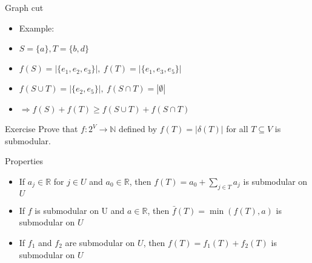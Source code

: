 \documentclass[usenames,dvipsnames]{beamer}
\newcommand{\R}{\mathbb{R}}
\newcommand{\N}{\mathbb{N}}
\begin{document}
  \begin{frame}{Graph cut}
    \begin{center}
    \end{center}
    \begin{itemize}
    \item[] Example: 
    \item $S = \{a\}, T = \{b,d\}$
    \item $f(S) = |\{e_1, e_2, e_3\}|,~f(T) = |\{e_1, e_3, e_5\}|$
    \item $f(S \cup T) = |\{e_2, e_5\}|,~f(S \cap T) = |\emptyset|$
    \item $\Rightarrow f(S) + f(T) \geq f(S \cup T) + f(S \cap T)$
    \end{itemize}
\end{frame}

  \begin{frame}{Exercise}
    Prove that $f: 2^V \rightarrow \N$ defined by $f(T) = |\delta(T)|$
    for all $T \subseteq V$ is submodular.
  \end{frame}


\begin{frame}{Properties}
  \begin{itemize}
  \item If $a_j \in \R$ for $j \in U$ and $a_0 \in \R$, then $f(T) =
    a_0 + \sum\limits_{j \in T} a_j$ is submodular on $U$
  \item If $f$ is submodular on U and $a \in \R$, then $\bar{f}(T) =
    \min(f(T),a)$ is submodular on $U$
  \item If $f_1$ and $f_2$ are submodular on $U$, then $f(T) = f_1(T)
    + f_2(T)$ is submodular on $U$
  \end{itemize}
\end{frame}
\end{document}
